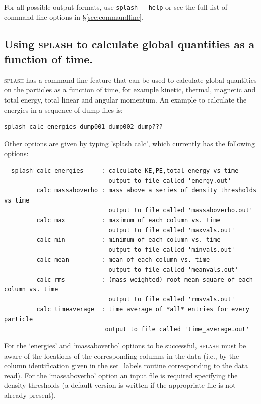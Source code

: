 \documentclass[a4paper,10pt]{article}
\newcommand{\splash}{\textsc{splash }}
\begin{document}
For all possible output formats, use \verb+splash --help+ or see the full list of command line options in \S\ref{sec:commandline}.

\subsection{Using \splash to calculate global quantities as a function of time.}
\label{sec:splashcalc}
 \splash has a command line feature that can be used to calculate global quantities on the particles as a function of time, for example kinetic, thermal, magnetic and total energy, total linear and angular momentum. An example to calculate the energies in a sequence of dump files is:
\begin{verbatim}
splash calc energies dump001 dump002 dump???
\end{verbatim}
Other options are given by typing 'splash calc', which currently has the following options:
\begin{verbatim}
  splash calc energies     : calculate KE,PE,total energy vs time
                             output to file called 'energy.out'
         calc massaboverho : mass above a series of density thresholds vs time
                             output to file called 'massaboverho.out'
         calc max          : maximum of each column vs. time
                             output to file called 'maxvals.out'
         calc min          : minimum of each column vs. time
                             output to file called 'minvals.out'
         calc mean         : mean of each column vs. time
                             output to file called 'meanvals.out'
         calc rms          : (mass weighted) root mean square of each column vs. time
                             output to file called 'rmsvals.out'
         calc timeaverage  : time average of *all* entries for every particle
                            output to file called 'time_average.out'
\end{verbatim}
For the `energies' and `massaboverho' options to be successful, \splash must be aware of the locations of the corresponding columns in the data (i.e., by the column identification given in the set\_labels routine corresponding to the data read). For the `massaboverho' option an input file is required specifying the density thresholds (a default version is written if the appropriate file is not already present).
 
\end{document}
